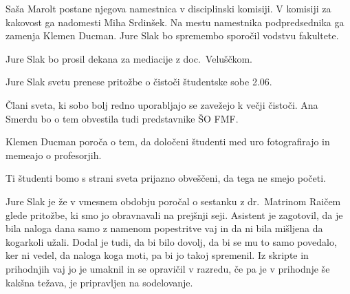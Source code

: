 \documentclass{seja}
\begin{document}
\begin{ad}
\begin{sklep*}
Saša Marolt postane njegova namestnica v disciplinski komisiji.
V komisiji za kakovost ga nadomesti Miha Srdinšek.
Na mestu namestnika podpredsednika ga zamenja Klemen Ducman.
Jure Slak bo spremembo sporočil vodstvu fakultete.
\end{sklep*}

\begin{sklep*}
Jure Slak bo prosil dekana za mediacije z doc.\ Veluščkom.
\end{sklep*}

Jure Slak svetu prenese pritožbe o čistoči študentske sobe 2.06.
\begin{sklep*}
Člani sveta, ki sobo bolj redno uporabljajo se zavežejo k večji čistoči.
Ana Smerdu bo o tem obvestila tudi predstavnike ŠO FMF.
\end{sklep*}

Klemen Ducman poroča o tem, da določeni študenti med uro fotografirajo in
memeajo o profesorjih.
\begin{sklep*}
Ti študenti bomo s strani sveta prijazno obveščeni, da tega ne smejo početi.
\end{sklep*}

Jure Slak je že v vmesnem obdobju poročal o sestanku z dr.~Matrinom Raičem glede
pritožbe, ki smo jo obravnavali na prejšnji seji.  Asistent je zagotovil, da je
bila naloga dana samo z namenom popestritve vaj in da ni bila mišljena da
kogarkoli užali.  Dodal je tudi, da bi bilo dovolj, da bi se mu to samo
povedalo, ker ni vedel, da naloga koga moti, pa bi jo takoj spremenil. Iz
skripte in prihodnjih vaj jo je umaknil in se opravičil v razredu, če pa je v
prihodnje še kakšna težava, je pripravljen na sodelovanje.

\end{ad}

\makeatletter \global\let\@enddocumenthook\@empty \makeatother
{}
\end{document}
